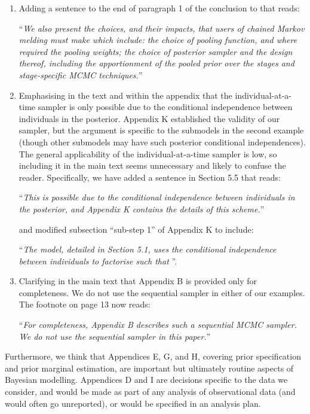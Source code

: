 \documentclass[
  10pt,
  a4paper,
]{article}
\begin{document}
\begin{enumerate}
\def\labelenumi{\arabic{enumi}.}
\item
  Adding a sentence to the end of paragraph 1 of the conclusion to that
  reads:

  ``\emph{We also present the choices, and their impacts, that users of
  chained Markov melding must make which include: the choice of pooling
  function, and where required the pooling weights; the choice of
  posterior sampler and the design thereof, including the apportionment
  of the pooled prior over the stages and stage-specific MCMC
  techniques.}''
\item
  Emphasising in the text and within the appendix that the
  individual-at-a-time sampler is only possible due to the conditional
  independence between individuals in the posterior. Appendix K
  established the validity of our sampler, but the argument is specific
  to the submodels in the second example (though other submodels may
  have such posterior conditional independences). The general
  applicability of the individual-at-a-time sampler is low, so including
  it in the main text seems unnecessary and likely to confuse the
  reader. Specifically, we have added a sentence in Section 5.5 that
  reads:

  ``\emph{This is possible due to the conditional independence between
  individuals in the posterior, and Appendix K contains the details of
  this scheme.}''

  and modified subsection ``sub-step 1'' of Appendix K to include:

  ``\emph{The model, detailed in Section 5.1, uses the conditional
  independence between individuals to factorise such that
  \textellipsis}''.
\item
  Clarifying in the main text that Appendix B is provided only for
  completeness. We do not use the sequential sampler in either of our
  examples. The footnote on page 13 now reads:

  ``\emph{For completeness, Appendix B describes such a sequential MCMC
  sampler. We do not use the sequential sampler in this paper.}''
\end{enumerate}

Furthermore, we think that Appendices E, G, and H, covering prior
specification and prior marginal estimation, are important but
ultimately routine aspects of Bayesian modelling. Appendices D and I are
decisions specific to the data we consider, and would be made as part of
any analysis of observational data (and would often go unreported), or
would be specified in an analysis plan.
\end{document}
